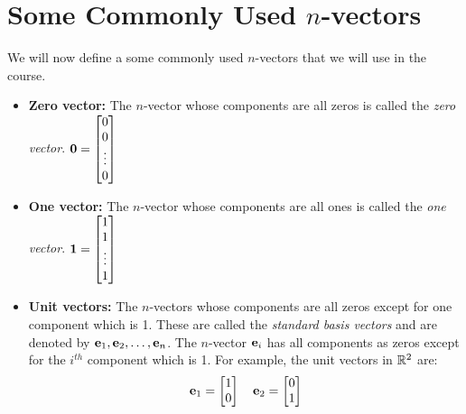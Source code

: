 \section{Some Commonly Used $n$-vectors}
We will now define a some commonly used $n$-vectors that we will use in the course. 
\begin{itemize}
    \item \textbf{Zero vector:} The $n$-vector whose components are all zeros is called the \textit{zero vector}. $\mf{0} = \bmxc 0 \\ 0 \\ \vdots \\ 0\emx$
    \item \textbf{One vector:} The $n$-vector whose components are all ones is called the \textit{one vector}. $\mf{1} = \bmxc 1 \\ 1 \\ \vdots \\ 1\emx$
    \item \textbf{Unit vectors:} The $n$-vectors whose components are all zeros except for one component which is 1. These are called the \textit{standard basis vectors} and are denoted by $\mathbf{e}_1, \mathbf{e}_2, \ldots, \mathbf{e}_n$. The $n$-vector $\mathbf{e}_i$ has all components as zeros except for the $i^{th}$ component which is 1. For example, the unit vectors in $\mathbb{R}^2$ are:
    \[ \mf{e}_1 = \bmx 1 \\ 0\emx \quad \mf{e}_2 = \bmx 0 \\ 1 \emx  \]
\end{itemize}

